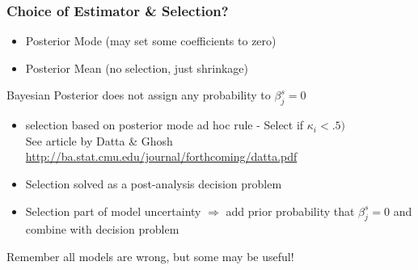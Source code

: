 \documentclass[]{beamer}
\begin{document}
\begin{frame}
  \frametitle{Choice of Estimator \& Selection?}

  \begin{itemize}
  \item Posterior Mode (may set some coefficients to zero) \pause
  \item Posterior Mean (no selection, just shrinkage) \pause
  \end{itemize}
  Bayesian Posterior does not assign any probability to $\beta^s_j = 0$ \pause

  \begin{itemize}
  \item selection based on posterior mode ad hoc rule - Select if
    $\kappa_i < .5)$ \pause \\
See  article by  Datta \& Ghosh
\url{http://ba.stat.cmu.edu/journal/forthcoming/datta.pdf} \pause
  \item Selection solved as a post-analysis decision problem \pause
  \item Selection part of model uncertainty $\Rightarrow$ add prior \pause
    probability that $\beta^s_j = 0$  and combine with decision problem 
  \end{itemize}
Remember all models are wrong, but some may be useful!
\end{frame}
\end{document}
